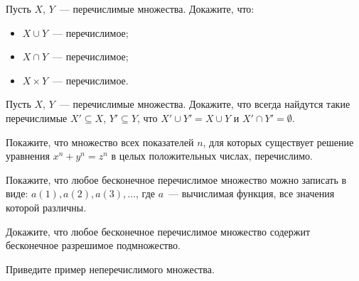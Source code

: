 \setcounter{curtask}{1}


\begin{task}
    Пусть $X$, $Y$~--- перечислимые множества. Докажите, что:
    \begin{itemize}
            \item $X \cup Y$~--- перечислимое;
	        \item $X \cap Y$~--- перечислимое;
        	\item $X \times Y$~--- перечислимое.
    \end{itemize}
\end{task}

\begin{task}
    Пусть $X$, $Y$~--- перечислимые множества. Докажите, что всегда
    найдутся такие перечислимые $X' \subseteq X$, $Y' \subseteq Y$,
    что $X' \cup Y' = X \cup Y$ и $X' \cap Y' = \emptyset$.
\end{task}

\begin{task}
    Покажите, что множество всех показателей $n$, для которых
    существует решение уравнения $x^n + y^n = z^n$ в целых положительных числах,
    перечислимо.
\end{task}

\begin{task}
    Покажите, что любое бесконечное перечислимое множество можно
    записать в виде: ${a(1), a(2), a(3), \dots}$, где $a$~---
    вычислимая функция, все значения которой различны.
\end{task}

\begin{task}
    Докажите, что любое бесконечное перечислимое множество содержит
    бесконечное разрешимое подмножество.
\end{task}

\begin{task}
    Приведите пример неперечислимого множества.
\end{task}
